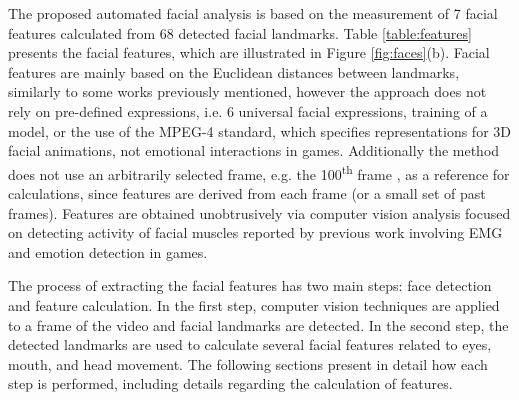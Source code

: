The proposed automated facial analysis is based on the measurement of 7 facial features calculated from 68 detected facial landmarks. Table \ref{table:features} presents the facial features, which are illustrated in Figure \ref{fig:faces}(b). Facial features are mainly based on the Euclidean distances between landmarks, similarly to some works previously mentioned, however the approach does not rely on pre-defined expressions, i.e. 6 universal facial expressions, training of a model, or the use of the MPEG-4 standard, which specifies representations for 3D facial animations, not emotional interactions in games. Additionally the method does not use an arbitrarily selected frame, e.g. the 100\textsuperscript{th} frame \parencite{giannakakis2017stress}, as a reference for calculations, since features are derived from each frame (or a small set of past frames). Features are obtained unobtrusively via computer vision analysis focused on detecting activity of facial muscles reported by previous work involving EMG and emotion detection in games.

The process of extracting the facial features has two main steps: face detection and feature calculation. In the first step, computer vision techniques are applied to a frame of the video and facial landmarks are detected. In the second step, the detected landmarks are used to calculate several facial features related to eyes, mouth, and head movement. The following sections present in detail how each step is performed, including details regarding the calculation of features.


